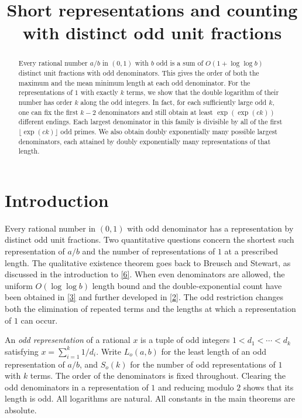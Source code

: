 \documentclass[11pt,a4paper]{article}
\title{Short representations and counting with distinct odd unit fractions}
\author{}
\date{}
\begin{document}
\maketitle

\begin{abstract}
Every rational number $a/b$ in $(0,1)$ with $b$ odd is a sum of $O(1+\log\log b)$ distinct unit fractions with odd denominators. This gives the order of both the maximum and the mean minimum length at each odd denominator. For the representations of $1$ with exactly $k$ terms, we show that the double logarithm of their number has order $k$ along the odd integers. In fact, for each sufficiently large odd $k$, one can fix the first $k-2$ denominators and still obtain at least $\exp(\exp(ck))$ different endings. Each largest denominator in this family is divisible by all of the first $\lfloor\exp(ck)\rfloor$ odd primes. We also obtain doubly exponentially many possible largest denominators, each attained by doubly exponentially many representations of that length.
\end{abstract}

\section{Introduction}

Every rational number in $(0,1)$ with odd denominator has a representation by distinct odd unit fractions. Two quantitative questions concern the shortest such representation of $a/b$ and the number of representations of $1$ at a prescribed length. The qualitative existence theorem goes back to Breusch and Stewart, as discussed in the introduction to \hyperlink{ref-6}{[6]}. When even denominators are allowed, the uniform $O(\log\log b)$ length bound and the double-exponential count have been obtained in \hyperlink{ref-3}{[3]} and further developed in \hyperlink{ref-2}{[2]}. The odd restriction changes both the elimination of repeated terms and the lengths at which a representation of $1$ can occur.

An \emph{odd representation} of a rational $x$ is a tuple of odd integers $1<d_1<\cdots<d_k$ satisfying $x=\sum_{i=1}^k 1/d_i$. Write $L_o(a,b)$ for the least length of an odd representation of $a/b$, and $S_o(k)$ for the number of odd representations of $1$ with $k$ terms. The order of the denominators is fixed throughout. Clearing the odd denominators in a representation of $1$ and reducing modulo $2$ shows that its length is odd. All logarithms are natural. All constants in the main theorems are absolute.
\end{document}

